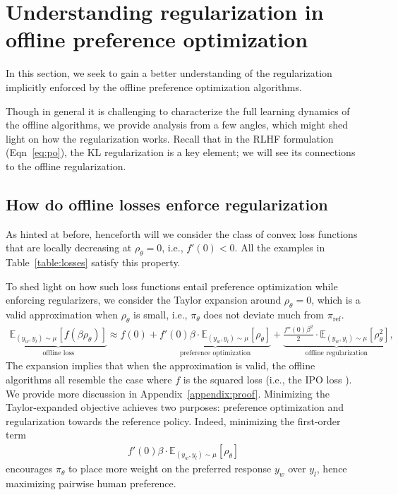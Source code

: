\section{Understanding regularization in offline preference optimization} \label{sec:regularization}

In this section, we seek to gain a better understanding of the regularization implicitly enforced by the offline preference optimization algorithms.

Though in general it is challenging to characterize the full learning dynamics of the offline algorithms, we provide analysis from a few angles, which might shed light on how the regularization works. Recall that in the RLHF formulation (Eqn~\ref{eq:po}), the KL regularization is a key element; we will see its connections to the offline regularization.

\subsection{How do offline losses enforce regularization}

As hinted at before, henceforth will we consider the class of convex loss functions that are locally decreasing at $\rho_\theta=0$, i.e., $f'(0)<0$. All the examples in Table~\ref{table:losses} satisfy this property. 

To shed light on how such loss functions entail preference optimization while enforcing regularizers, we consider the Taylor expansion around $\rho_\theta=0$, which is a valid approximation when $\rho_\theta$ is small, i.e., $\pi_\theta$ does not deviate much from $\pi_\text{ref}$.
\begin{align*}
   \underbrace{\mathbb{E}_{(y_w,y_l)\sim \mu}\left[f(\beta\rho_\theta)\right]}_{\text{offline loss}} \approx f(0) + \underbrace{f'(0)\beta\cdot\mathbb{E}_{(y_w,y_l)\sim \mu}\left[\rho_\theta\right]}_{\text{preference optimization}} + \underbrace{\frac{f''(0)\beta^2}{2}\cdot\mathbb{E}_{(y_w,y_l)\sim \mu}\left[\rho_\theta^2\right]}_{\text{offline regularization}}, 
\end{align*}
The expansion implies that when the approximation is valid, the offline algorithms all resemble the case where $f$ is the squared loss (i.e., the IPO loss \citep{azar2023general}). We provide more discussion in Appendix~\ref{appendix:proof}. Minimizing the Taylor-expanded objective achieves two purposes: preference optimization and regularization towards the reference policy. Indeed,  minimizing the first-order term 
\begin{align*}
    f'(0)\beta\cdot\mathbb{E}_{(y_w,y_l)\sim \mu}[\rho_\theta]
\end{align*}
encourages $\pi_\theta$ to place more weight on the preferred response $y_w$ over $y_l$, hence maximizing pairwise human preference. 

